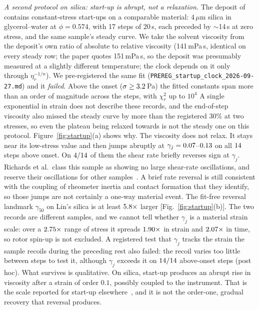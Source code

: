 \documentclass[aps,pre,reprint,superscriptaddress,nofootinbib]{revtex4-2}
\begin{document}
\emph{A second protocol on silica: start-up is abrupt, not a relaxation.}
The deposit of \citet{Richards2019} contains constant-stress start-ups on a comparable
material: $4\,\mu$m silica in glycerol--water at $\phi=0.574$, with 17 steps of 20\,s,
each preceded by $\sim$14\,s at zero stress, and the same sample's steady curve. We take
the solvent viscosity from the deposit's own ratio of absolute to relative viscosity
(141\,mPa\,s, identical on every steady row; the paper quotes 151\,mPa\,s, so the deposit
was presumably measured at a slightly different temperature; the clock depends on it only
through $\eta_r^{-1/n}$).  %
We
pre-registered the same fit (\texttt{PREREG\_startup\_clock\_2026-09-27.md}) and it
\emph{failed}. Above the onset ($\sigma\ge3.2$\,Pa) the fitted constants span
more than an order of magnitude across the steps, with $\chi^2_r$ up to $10^4$  %
 A single
exponential in strain does not describe these records, and the end-of-step viscosity also missed the steady curve by more than the registered $30\%$ at two stresses, so even the plateau being relaxed towards is not the steady one  %
on this protocol. Figure~\ref{fig:startup}(a) shows
why. The viscosity does not relax. It stays near its low-stress value and then jumps
abruptly at $\gamma_j=0.07$--$0.13$ on all
$14$ steps above onset. On $4/14$ of them the shear rate briefly reverses sign at $\gamma_j$. Richards et al.\ class this sample as showing no large shear-rate oscillations, and reserve their oscillations for other samples~\cite{Richards2019}. A brief rate reversal is still consistent with the coupling of rheometer inertia and contact formation that they identify, so those jumps are not certainly a one-way material event. The fit-free reversal landmark $\gamma_{50}$ on Lin's
silica is at least $5.8\times$ larger [Fig.~\ref{fig:startup}(b)]. The two
records are different samples, and we cannot tell whether $\gamma_j$ is a material strain
scale: over a $2.75\times$ range of stress it spreads $1.90\times$ in strain
and $2.07\times$ in time, so rotor spin-up is not excluded. A registered test that
$\gamma_j$ tracks the strain the sample recoils during the preceding rest also failed:
the recoil varies too little between steps to test it, although $\gamma_j$ exceeds it on
$14/14$ above-onset steps (post hoc). What survives is qualitative. On silica, start-up produces an abrupt
rise in viscosity after a strain of order $0.1$, possibly coupled to the instrument. That is the scale reported for start-up
elsewhere~\cite{Richards2019,Han2018}, and it is not the order-one, gradual recovery that
reversal produces.
\end{document}
